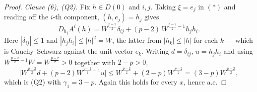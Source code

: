 \begin{proof}
\emph{Clause (6), (Q2).}  Fix $h\in D(0)$ and $i,j$.  Taking $\xi=e_j$ in
$(\ast)$ and reading off the $i$-th component, $(h,e_j)=h_j$ gives
\[
D_{h_j}A^i(h)=W^{\frac{p-2}2}\delta_{ij}+(p-2)\,W^{\frac{p-2}2-1}h_jh_i .
\]
Here $|\delta_{ij}|\le1$ and $|h_jh_i|\le|h|^2=W$, the latter from
$|h_k|\le|h|$ for each $k$ --- which is Cauchy--Schwarz against the unit vector
$e_k$.  Writing $d=\delta_{ij}$, $u=h_jh_i$ and using
$W^{\frac{p-2}2-1}W=W^{\frac{p-2}2}>0$ together with $2-p>0$,
\[
\bigl|W^{\frac{p-2}2}d+(p-2)W^{\frac{p-2}2-1}u\bigr|
\le W^{\frac{p-2}2}+(2-p)W^{\frac{p-2}2}=(3-p)W^{\frac{p-2}2},
\]
which is (Q2) with $\gamma_1=3-p$.  Again this holds for every $x$, hence a.e.
\end{proof}
